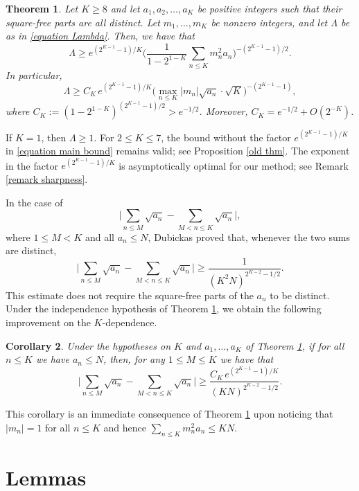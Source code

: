 \documentclass[reqno,12pt]{amsart}
\newtheorem{theorem}{Theorem}[section]
\newtheorem{corollary}[theorem]{Corollary}
\theoremstyle{remark}
\begin{document}
\begin{theorem}\label{theorem principal}
Let $K\geq 8$ and let $a_1,a_2,\ldots,a_K$ be positive integers such that their square-free parts are all distinct. Let $m_1,\ldots,m_K$ be nonzero integers, and let $\Lambda$ be as in \eqref{equation Lambda}. Then, we have that
\begin{equation}\label{equation main bound}
\Lambda\geq e^{(2^{K-1}-1)/K} \bigg(\frac{1}{1-2^{1-K}}\sum_{n\leq K} m_n^2a_n\bigg)^{-(2^{K-1}-1)/2}.
\end{equation}
In particular,
$$ \Lambda\geq C_K\, e^{(2^{K-1}-1)/K} \bigg(\max_{n\leq K}|m_n|\sqrt{a_n}\cdot \sqrt{K}\bigg)^{-(2^{K-1}-1)}, $$
where $C_K := (1-2^{1-K})^{(2^{K-1}-1)/2}>e^{-1/2}$. Moreover, $C_K=e^{-1/2}+O(2^{-K})$.
\end{theorem}

If $K=1$, then $\Lambda\geq 1$. For $2\leq K\leq7$, the bound without the factor $e^{(2^{K-1}-1)/K}$ in \eqref{equation main bound} remains valid; see Proposition \ref{old thm}. The exponent in the factor $e^{(2^{K-1}-1)/K}$ is asymptotically optimal for our method; see Remark \ref{remark sharpness}.

In the case of
$$ \bigg|\sum_{n\leq M}\sqrt{a_n}-\sum_{M<n\leq K}\sqrt{a_n}\bigg|, $$
where $1\leq M<K$ and all $a_n\leq N$, Dubickas \cite[Theorem 1]{Dubickas_square_roots} proved that, whenever the two sums are distinct,
$$ \bigg|\sum_{n\leq M}\sqrt{a_n}-\sum_{M<n\leq K}\sqrt{a_n}\bigg|\geq \frac{1}{(K^2 N)^{2^{K-2}-1/2}}. $$
This estimate does not require the square-free parts of the $a_n$ to be distinct. Under the independence hypothesis of Theorem \ref{theorem principal}, we obtain the following improvement on the $K$-dependence.

\begin{corollary}
Under the hypotheses on $K$ and $a_1,\ldots,a_K$ of Theorem \ref{theorem principal}, if for all $n\leq K$ we have $a_n\leq N$, then, for any $1\leq M\leq K$ we have that
$$ \bigg|\sum_{n\leq M}\sqrt{a_n}-\sum_{M<n\leq K}\sqrt{a_n}\bigg|\geq \frac{C_K\, e^{(2^{K-1}-1)/K}}{(KN)^{2^{K-2}-1/2}}. $$
\end{corollary}

This corollary is an immediate consequence of Theorem \ref{theorem principal} upon noticing that $|m_n|=1$ for all $n\leq K$ and hence $\sum_{n\leq K}m_n^2a_n\leq KN$.

\section{Lemmas}\label{section lemmas}
\end{document}
